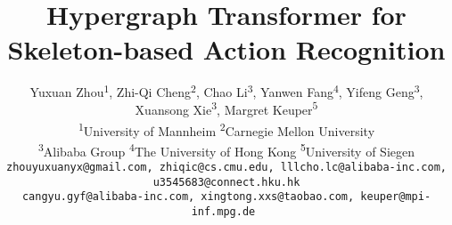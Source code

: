 \documentclass[10pt,twocolumn,letterpaper]{article}
\begin{document}
\title{Hypergraph Transformer for Skeleton-based Action Recognition}



\author{Yuxuan Zhou\textsuperscript{$1$},
Zhi-Qi Cheng\textsuperscript{$2$},
Chao Li\textsuperscript{$3$},
Yanwen Fang\textsuperscript{$4$},
Yifeng Geng\textsuperscript{$3$},
Xuansong Xie\textsuperscript{$3$},
Margret Keuper\textsuperscript{$5$}\\
\textsuperscript{1}{University of Mannheim}
\textsuperscript{2}{Carnegie Mellon University}\\
\textsuperscript{3}{Alibaba Group}
\textsuperscript{4}{The University of Hong Kong}
\textsuperscript{5}{University of Siegen}\\
{\tt \small zhouyuxuanyx@gmail.com, zhiqic@cs.cmu.edu,
lllcho.lc@alibaba-inc.com, u3545683@connect.hku.hk}\\
{\tt \small cangyu.gyf@alibaba-inc.com, xingtong.xxs@taobao.com,
keuper@mpi-inf.mpg.de
}
}


\maketitle
\ificcvfinal\thispagestyle{empty}\fi
\end{document}
